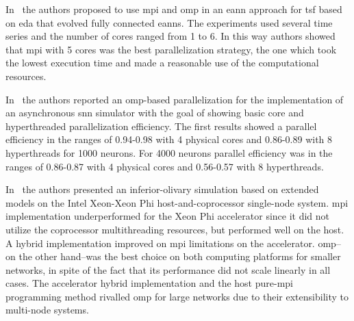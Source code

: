 \documentclass[10pt,journal,compsoc]{IEEEtran}
\begin{document}
In~\cite{6232827} the authors proposed to use \gls{mpi} and \gls{omp} in an \gls{eann} approach for \gls{tsf} based on \gls{eda} that evolved fully connected \glspl{eann}. The experiments used several time series and the number of cores ranged from 1 to 6. In this way authors showed that \gls{mpi} with 5 cores was the best parallelization strategy, the one which took the lowest execution time and made a reasonable use of the computational resources.

In~\cite{6511739} the authors reported an \gls{omp}-based parallelization for the implementation of an asynchronous \gls{snn} simulator with the goal of showing basic core and hyperthreaded parallelization efficiency. The first results showed a parallel efficiency in the ranges of 0.94-0.98 with 4 physical cores and 0.86-0.89 with 8 hyperthreads for 1000 neurons. For 4000 neurons parallel efficiency was in the ranges of 0.86-0.87 with 4 physical cores and 0.56-0.57 with 8 hyperthreads.

In~\cite{Chatzikonstantis:2016:FID:2903150.2903477} the authors presented an inferior-olivary simulation based on extended  models on the Intel Xeon-Xeon Phi host-and-coprocessor single-node system. \gls{mpi} implementation underperformed for the Xeon Phi accelerator since it did not utilize the coprocessor multithreading resources, but performed well on the host. A hybrid implementation improved on \gls{mpi} limitations on the accelerator. \gls{omp}--on the other hand--was the best choice on both computing platforms for smaller networks, in spite of the fact that its performance did not scale linearly in all cases. The accelerator hybrid implementation and the host pure-\gls{mpi} programming method rivalled \gls{omp} for large networks due to their extensibility to multi-node systems.
\end{document}
